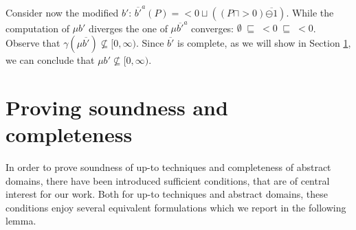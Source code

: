 \documentclass{llncs}
\begin{document}
Consider now the modified $b'$: $\overline{b'}^a(P)=  < \!0 \sqcup ((P\sqcap >\!0)\overline{\ominus\! 1})$. While the computation of $\mu b'$ diverges the one of $\mu \overline{b'}^a$ converges: $\emptyset \; \sqsubseteq \; < \!0 \; \sqsubseteq \; < \!0$. Observe that $\gamma (\mu \overline{b'}) \not \subseteq [0,\infty)$. Since $\overline{b'}$ is complete, as we will show in Section \ref{}, we can conclude that $\mu b' \not \subseteq [0,\infty)$.

\section{Proving soundness and completeness}
%
In order to prove soundness of up-to techniques and completeness of abstract domains, there have been introduced sufficient conditions, that are of central interest for our work. Both for up-to techniques and abstract domains, these conditions enjoy several equivalent formulations which we report in the following lemma.
\end{document}
